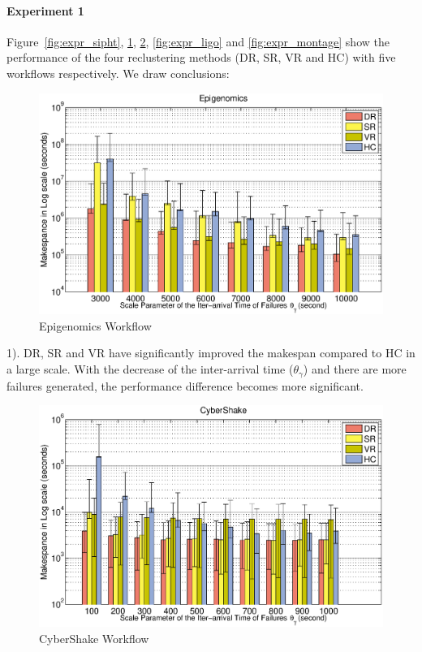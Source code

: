 \documentclass{IOS-Book-Article}
\begin{document}
\paragraph{\textbf{Experiment 1}}
Figure~\ref{fig:expr_sipht}, \ref{fig:expr_genome}, \ref{fig:expr_cybershake}, \ref{fig:expr_ligo} and \ref{fig:expr_montage} show the performance of the four reclustering methods (DR, SR, VR and HC) with five workflows respectively. We draw conclusions: 

\begin{figure}[!htb]
\centering
  \includegraphics[width=1.0\linewidth]{genome.eps}
  \caption{Epigenomics Workflow}
  \label{fig:expr_genome}
\end{figure}


1). DR, SR and VR have significantly improved the makespan compared to HC in a large scale. With the decrease of the inter-arrival time ($\theta_{\gamma}$) and there are more failures generated, the performance difference 
 becomes more significant. 


\begin{figure}[!htb]
\centering
  \includegraphics[width=1.0\linewidth]{cybershake.eps}
  \caption{CyberShake Workflow}
  \label{fig:expr_cybershake}
\end{figure}
\end{document}
